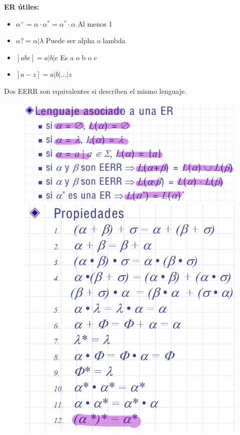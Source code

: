\documentclass[12pt, twoside, openright]{report} %
\begin{document}
\textbf{ER útiles:}

\begin{itemize}
\item
  \(\alpha ^+ =\alpha \cdot \alpha ^*= \alpha ^* \cdot \alpha\) Al menos
  1
\item
  \(\alpha? = \alpha | \lambda\) Puede ser alpha o lambda
\item
  \([abc] = a|b|c\) Es a o b o c
\item
  \([a-z] = a|b|...|z\)
\end{itemize}

Dos EERR son equivalentes si describen el mismo lenguaje.

\begin{figure}[H]
	{\includegraphics[scale=.15]{Untitled 5.png}
	\includegraphics[scale=.25]{Untitled 6.png}}

\end{figure}
\end{document}
